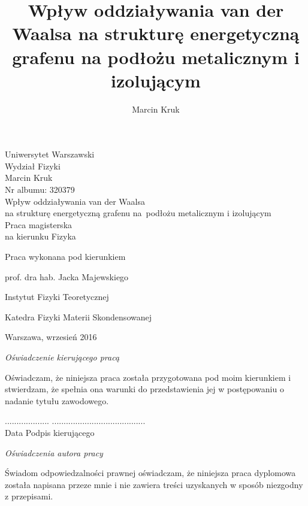 \documentclass[a4paper,12pt]{article}
\title{Wpływ oddziaływania van der Waalsa na strukturę energetyczną grafenu na podłożu metalicznym i izolującym}
\author{Marcin Kruk}
\date{}
\begin{document}
%
%
\thispagestyle{empty}
\vspace*{2cm}
\begin{center}
{\huge Uniwersytet Warszawski\\ \vspace{0.3cm}
Wydział Fizyki}\\
\vspace{1.5cm}
Marcin Kruk\\
Nr albumu: 320379\\
\vspace{1.5cm}
{\huge Wpływ oddziaływania van der Waalsa\\
	na strukturę energetyczną grafenu
	\mbox{na podłożu} metalicznym i izolującym}\\

\vspace{2cm}
Praca magisterska\\
na kierunku Fizyka
\end{center}
\vspace{3cm}
\hfill Praca wykonana pod kierunkiem \vspace{0.2cm}

\hfill prof. dra hab. Jacka Majewskiego

\hfill Instytut Fizyki Teoretycznej

\hfill Katedra Fizyki Materii Skondensowanej
\vfill
\begin{center}
{\large Warszawa, wrzesień 2016}\\
\end{center}
%
%
%
%
\newpage
\thispagestyle{empty}
\vspace*{2cm}
\noindent
\emph{Oświadczenie kierującego pracą}
\vspace{0.6cm}


\noindent Oświadczam, że niniejsza praca została przygotowana pod moim kierunkiem i stwierdzam, że spełnia ona warunki do przedstawienia jej w postępowaniu o nadanie tytułu zawodowego.
\vspace{1cm}

\noindent ................... \hfill ........................................\\
 Data \hfill Podpis kierującego
\vspace{3cm}

\noindent \emph{Oświadczenia autora pracy}
\vspace{0.6cm}


\noindent Świadom odpowiedzalności prawnej oświadczam, że niniejsza praca dyplomowa została napisana przeze mnie i nie zawiera treści uzyskanych w sposób niezgodny z przepisami.
\vspace{0.3cm}
\end{document}
